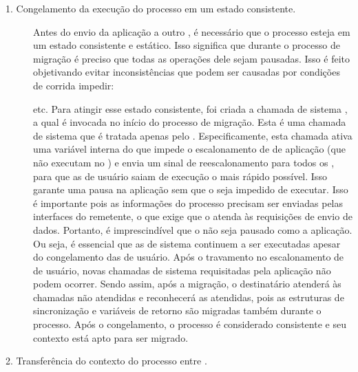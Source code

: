 \begin{description}
	\item[1. Congelamento da execução do processo em um estado consistente.] \hfill
	
    Antes do envio da aplicação a outro \cluster, é necessário que o processo esteja em um estado consistente e estático. Isso significa que durante o processo de migração é preciso que todas as operações dele sejam pausadas. Isso é feito objetivando evitar inconsistências que podem ser causadas por condições de corrida \eg impedir:
     etc. 
    Para atingir esse estado consistente, foi criada a chamada de sistema \freeze, a qual é invocada no início do processo de migração. Esta é uma chamada de sistema que é tratada apenas pelo \mcore. Especificamente, esta chamada ativa uma variável interna do \so que impede o escalonamento de \threads de aplicação (\threads que não executam no \mcore) e envia um sinal de reescalonamento para todos os \scores, para que as \threads de usuário saiam de execução o mais rápido possível. Isso garante uma pausa na aplicação sem que o \so seja impedido de executar. Isso é importante pois as informações do processo precisam ser enviadas pelas interfaces \noc do \cluster remetente, o que exige que o \so atenda às requisições de envio de dados. Portanto, é imprescindível que o \so não seja pausado como a aplicação. Ou seja, é essencial que as \threads de sistema continuem a ser executadas apesar do congelamento das de usuário.
    Após o travamento no escalonamento de \threads de usuário, novas chamadas de sistema requisitadas pela aplicação não podem ocorrer. Sendo assim, após a migração, o \cluster destinatário atenderá às chamadas não atendidas e reconhecerá as atendidas, pois as estruturas de sincronização e variáveis de retorno são migradas também durante o processo. Após o congelamento, o processo é considerado consistente e seu contexto está apto para ser migrado.
    
	\item[2. Transferência do contexto do processo entre \clusters.] \hfill
    

\end{description}
